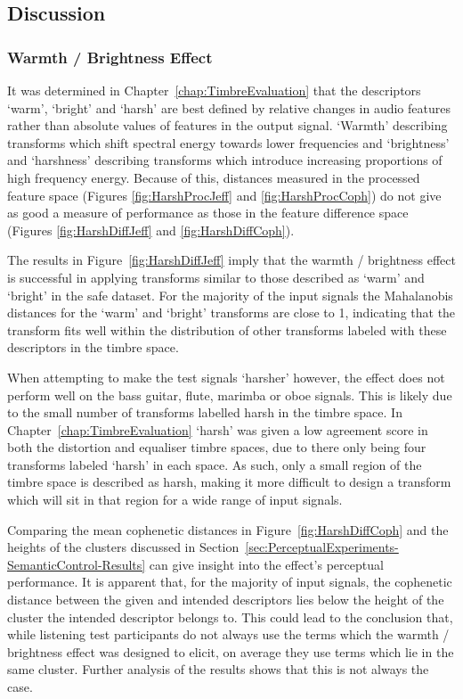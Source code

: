 	\subsection{Discussion}
	\label{sec:PerceptualExperiments-SemanticControl-Discussion}
		\subsubsection*{Warmth / Brightness Effect}
			It was determined in Chapter~\ref{chap:TimbreEvaluation} that the descriptors `warm', `bright' and
			`harsh' are best defined by relative changes in audio features rather than absolute values of
			features in the output signal. `Warmth' describing transforms which shift spectral energy towards
			lower frequencies and `brightness' and `harshness' describing transforms which introduce increasing
			proportions of high frequency energy. Because of this, distances measured in the processed feature
			space (Figures \ref{fig:HarshProcJeff} and \ref{fig:HarshProcCoph}) do not give as good a measure
			of performance as those in the feature difference space (Figures \ref{fig:HarshDiffJeff} and
			\ref{fig:HarshDiffCoph}).

			The results in Figure~\ref{fig:HarshDiffJeff} imply that the warmth / brightness effect is
			successful in applying transforms similar to those described as `warm' and `bright' in the
			\acrshort{safe} dataset. For the majority of the input signals the Mahalanobis distances for the
			`warm' and `bright' transforms are close to 1, indicating that the transform fits well within the
			distribution of other transforms labeled with these descriptors in the timbre space.
			
			When attempting to make the test signals `harsher' however, the effect does not perform well on the
			bass guitar, flute, marimba or oboe signals. This is likely due to the small number of transforms
			labelled harsh in the timbre space. In Chapter~\ref{chap:TimbreEvaluation} `harsh' was given a low
			agreement score in both the distortion and equaliser timbre spaces, due to there only being four
			transforms labeled `harsh' in each space. As such, only a small region of the timbre space is
			described as harsh, making it more difficult to design a transform which will sit in that region
			for a wide range of input signals.
			
			Comparing the mean cophenetic distances in Figure~\ref{fig:HarshDiffCoph} and the heights of the
			clusters discussed in Section~\ref{sec:PerceptualExperiments-SemanticControl-Results} can give
			insight into the effect's perceptual performance. It is apparent that, for the majority of input
			signals, the cophenetic distance between the given and intended descriptors lies below the height
			of the cluster the intended descriptor belongs to. This could lead to the conclusion that, while
			listening test participants do not always use the terms which the warmth / brightness effect was
			designed to elicit, on average they use terms which lie in the same cluster. Further analysis of
			the results shows that this is not always the case. 

